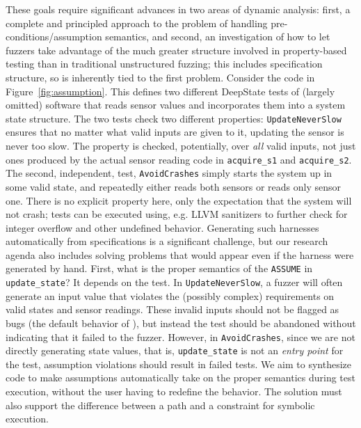   These goals require significant advances in two areas of dynamic analysis: first, a complete and principled approach to the problem of handling pre-conditions/assumption semantics, and second, an investigation of how to let fuzzers take advantage of the much greater structure involved in property-based testing than in traditional unstructured fuzzing; this includes specification structure, so is inherently tied to the first problem.  Consider the code in Figure~\ref{fig:assumption}.  This defines two different DeepState tests of (largely omitted) software that reads sensor values and incorporates them into a system state structure.  The two tests check two different properties:  {\tt UpdateNeverSlow} ensures that no matter what valid inputs are given to it, updating the sensor is never too slow.  The property is checked, potentially, over \emph{all} valid inputs, not just ones produced by the actual sensor reading code in {\tt acquire\_s1} and {\tt acquire\_s2}.  The second, independent, test, {\tt AvoidCrashes} simply starts the system up in some valid state, and repeatedly either reads both sensors or reads only sensor one.  There is no explicit property here, only the expectation that the system will not crash; tests can be executed using, e.g. LLVM sanitizers to further check for integer overflow and other undefined behavior.  Generating such harnesses automatically from \acsl specifications is a significant challenge, but our research agenda also includes solving problems that would appear even if the harness were generated by hand.  First, what is the proper semantics of the {\tt ASSUME} in {\tt update\_state}?  It depends on the test.  In {\tt UpdateNeverSlow}, a fuzzer will often generate an input value that violates the (possibly complex) requirements on valid states and sensor readings.  These invalid inputs should not be flagged as bugs (the default behavior of \eacsl), but instead the test should be abandoned without indicating that it failed to the fuzzer.  However, in {\tt AvoidCrashes}, since we are not directly generating state values, that is, {\tt update\_state} is not an \emph{entry point} for the test, assumption violations should result in failed tests.  We aim to synthesize code to make assumptions automatically take on the proper semantics during test execution, without the user having to redefine the behavior.  The solution must also support the difference between a path and a constraint for symbolic execution.

